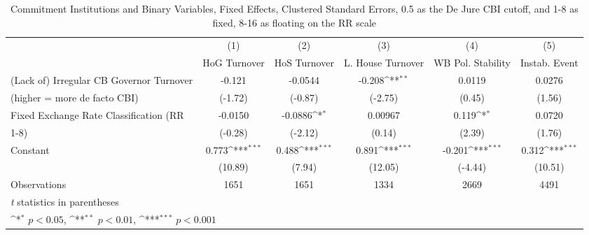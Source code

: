 \begin{table}[htbp]\centering
\def\sym#1{\ifmmode^{#1}\else\(^{#1}\)\fi}
\caption{Commitment Institutions and Binary Variables, Fixed Effects, Clustered Standard Errors, 0.5 as the De Jure CBI cutoff, and 1-8 as fixed, 8-16 as floating on the RR scale \label{binaryIndFEDF}}
\begin{tabular}{l*{5}{c}}
\toprule
                                        &\multicolumn{1}{c}{(1)}&\multicolumn{1}{c}{(2)}&\multicolumn{1}{c}{(3)}&\multicolumn{1}{c}{(4)}&\multicolumn{1}{c}{(5)}\\
                                        &\multicolumn{1}{c}{HoG Turnover}&\multicolumn{1}{c}{HoS Turnover}&\multicolumn{1}{c}{L. House Turnover}&\multicolumn{1}{c}{WB Pol. Stability}&\multicolumn{1}{c}{Instab. Event}\\
\midrule
(Lack of) Irregular CB Governor Turnover&   -0.121         &  -0.0544         &   -0.208\sym{**} &   0.0119         &   0.0276         \\
(higher = more de facto CBI)            &  (-1.72)         &  (-0.87)         &  (-2.75)         &   (0.45)         &   (1.56)         \\
\addlinespace
Fixed Exchange Rate Classification (RR  &  -0.0150         &  -0.0886\sym{*}  &  0.00967         &    0.119\sym{*}  &   0.0720         \\
1-8)                                    &  (-0.28)         &  (-2.12)         &   (0.14)         &   (2.39)         &   (1.76)         \\
\addlinespace
Constant                                &    0.773\sym{***}&    0.488\sym{***}&    0.891\sym{***}&   -0.201\sym{***}&    0.312\sym{***}\\
                                        &  (10.89)         &   (7.94)         &  (12.05)         &  (-4.44)         &  (10.51)         \\
\midrule
Observations                            &     1651         &     1651         &     1334         &     2669         &     4491         \\
\bottomrule
\multicolumn{6}{l}{\footnotesize \textit{t} statistics in parentheses}\\
\multicolumn{6}{l}{\footnotesize \sym{*} \(p<0.05\), \sym{**} \(p<0.01\), \sym{***} \(p<0.001\)}\\
\end{tabular}
\end{table}

